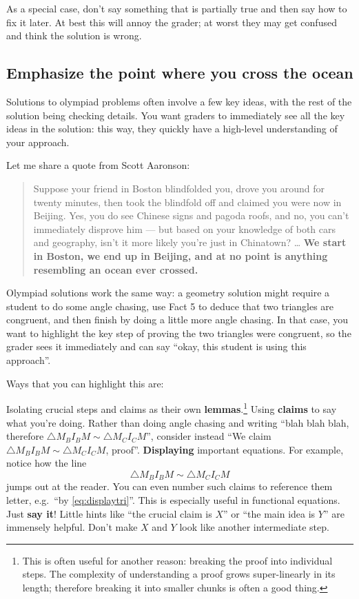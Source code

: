 As a special case, don't say something that is partially true
and then say how to fix it later.
At best this will annoy the grader;
at worst they may get confused and think the solution is wrong.

\subsection{Emphasize the point where you cross the ocean}
Solutions to olympiad problems often involve a few key ideas,
with the rest of the solution being checking details.
You want graders to immediately see all the key ideas in the solution:
this way, they quickly have a high-level understanding of your approach.

Let me share a quote from Scott Aaronson:
\begin{quote}
	Suppose your friend in Boston blindfolded you,
	drove you around for twenty minutes,
	then took the blindfold off and claimed you were now in Beijing.
	Yes, you do see Chinese signs and pagoda roofs,
	and no, you can't immediately disprove him ---
	but based on your knowledge of both cars and geography,
	isn't it more likely you're just in Chinatown?
	\dots
	\textbf{We start in Boston, we end up in Beijing,
	and at no point is anything resembling an ocean ever crossed.}
\end{quote}
Olympiad solutions work the same way:
a geometry solution might require a student to do some angle chasing,
use Fact 5 to deduce that two triangles are congruent,
and then finish by doing a little more angle chasing.
In that case, you want to highlight the key step of proving the two triangles
were congruent, so the grader sees it immediately and can say
``okay, this student is using this approach''.

Ways that you can highlight this are:
\begin{itemize}
	\ii Isolating crucial steps and claims as their own
	\textbf{lemmas}.\footnote{This is often useful for another reason:
		breaking the proof into individual steps.
		The complexity of understanding a proof grows super-linearly
		in its length; therefore breaking it into smaller chunks
		is often a good thing.}
	\ii Using \textbf{claims} to say what you're doing.
	Rather than doing angle chasing and writing
	``blah blah blah, therefore $\triangle M_B I_B M \sim \triangle M_C I_C M$'',
	consider instead ``We claim $\triangle M_B I_B M \sim \triangle M_C I_C M$, proof''.
	\ii \textbf{Displaying} important equations.
	For example, notice how the line
	\begin{equation}
		\triangle M_B I_B M \sim \triangle M_C I_C M
		\label{eq:displaytri}
	\end{equation}
	jumps out at the reader.
	You can even number such claims to reference them letter,
	e.g.\ ``by \eqref{eq:displaytri}''.
	This is especially useful in functional equations.
	\ii Just \textbf{say it}!
	Little hints like ``the crucial claim is $X$''
	or ``the main idea is $Y$'' are immensely helpful.
	Don't make $X$ and $Y$ look like another intermediate step.
\end{itemize}

